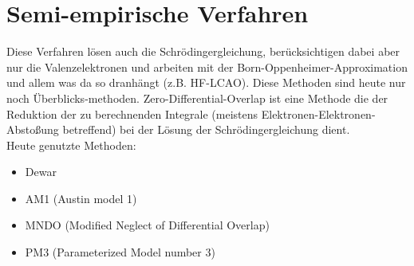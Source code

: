 \documentclass[12pt,a4paper,oneside,normalheadings,abstracton,liststotoc,bibtotoc,titlepage,pdftex]{scrartcl}
\begin{document}
\section{Semi-empirische Verfahren}
Diese Verfahren lösen auch die Schrödingergleichung, berücksichtigen dabei aber nur die Valenzelektronen und arbeiten mit der Born-Oppenheimer-Approximation und allem was da so dranhängt (z.B. HF-LCAO). Diese Methoden sind heute nur noch Überblicks-methoden. Zero-Differential-Overlap ist eine Methode die der Reduktion der zu berechnenden Integrale (meistens Elektronen-Elektronen-Abstoßung betreffend) bei der Lösung der Schrödingergleichung dient.\\
Heute genutzte Methoden:
\begin{itemize}
\item Dewar
\item AM1 (Austin model 1)
\item MNDO (Modified Neglect of Differential Overlap)
\item PM3 (Parameterized Model number 3)
\end{itemize}
\end{document}

